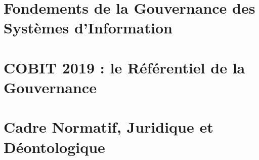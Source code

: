 \documentclass[12pt, twoside, openright, a4paper]{book}
\begin{document}
    \part{Fondements de la Gouvernance des Systèmes d'Information}
    \label{part:fondements}

        
        
        
        

    \part{COBIT 2019 : le Référentiel de la Gouvernance}
    \label{part:cobit}

        
        
        
        

    \part{Cadre Normatif, Juridique et Déontologique}
    \label{part:normatif}

        
        
        
\end{document}
